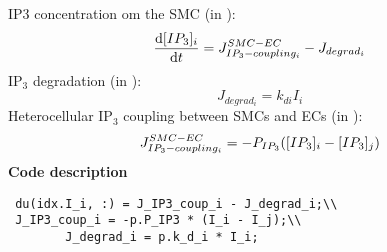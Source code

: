 \documentclass[fleqn]{report}
\numberwithin{equation}{section}
\numberwithin{equation}{section}
\begin{document}
 			\gls{IP3} concentration om the \gls{SMC} (in \uM): 
 			\begin{equation} \label{eq:dIidt}
 			\dfrac{\mathrm{d}[IP_{3}] _{i}}{\mathrm{d}t} = J^{SMC-EC}_{IP_{3}-coupling_{i}} - J_{degrad_{i}}
 			\end{equation}
 			 		IP$_{3}$ degradation (in \uMs): 
 			 		\begin{equation} \label{eq:Jdegradi}
 			 		J_{degrad_{i}}= k_{di}I_{i}
 			 		\end{equation}
 			 		 		Heterocellular IP$_{3}$ coupling between SMCs and ECs (in \uMs):
 			 		 		\begin{equation} \label{eq:JIP3couplingi}
 			 		 		J_{IP_{3}-coupling_{i}}^{SMC-EC}= -P_{IP_{3}}([IP_{3}]_{i}-[IP_{3}]_{j})
 			 		 		\end{equation}
 			 		\textbf{Code description}
\begin{verbatim}
 du(idx.I_i, :) = J_IP3_coup_i - J_degrad_i;\\
 J_IP3_coup_i = -p.P_IP3 * (I_i - I_j);\\
  		J_degrad_i = p.k_d_i * I_i;
\end{verbatim}
\end{document}
